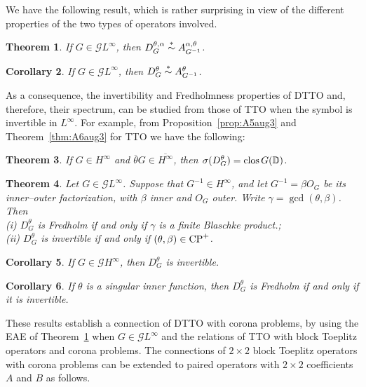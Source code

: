 \documentclass[11pt]{article}
\newtheorem{thm}{Theorem}[section]
\newtheorem{cor}[thm]{Corollary}
\def\DD{\mathbb D}
\def\G{\mathcal G}
\def\ol{\overline}
\newcommand{\simast}{%
    \ensuremath{%
       \stackrel{\mathsf{\ast}}{\sim}}}
\def\CP{{\rm CP}}
\def\clos{\mathop{\rm clos}\nolimits}
\begin{document}
 We have the following result, which is rather surprising in view of the different properties
 of the two types of operators involved.
 
 \begin{thm}\cite{CKLP}\label{thm:4.1Baug3}
 If $G \in \G L^\infty$, then $D^{\theta,\alpha}_G \simast A^{\alpha,\theta}_{G^{-1}}$.
 \end{thm}
 
 \begin{cor} \cite{CKLP}
  If $G \in \G L^\infty$, then $D^{\theta}_G \simast A^{\theta}_{G^{-1}}$.
  \end{cor}
  
  As a consequence, the invertibility and Fredholmness properties of DTTO and, therefore, their spectrum, can   be studied from those of TTO when the symbol is invertible in $L^\infty$.
For example, from Proposition~\ref{prop:A5aug3} and Theorem~\ref{thm:A6aug3} for TTO we have the following:
  
  \begin{thm}\cite{CKLP}
  If $G \in H^\infty$ and $\ol\theta G \in \ol{H^\infty}$, then
  $\sigma(D^\theta_G)=\clos G(\DD)$.
  \end{thm}
  
  \begin{thm}\cite{CKLP}
  Let $G \in \G L^\infty$. Suppose that $G^{-1} \in H^\infty$, and let $G^{-1}=\beta O_G$ be its inner--outer factorization, with $\beta$ inner and $O_G$ outer. Write $\gamma= \gcd(\theta,\beta)$. Then\\
  (i) $D^\theta_G$ is Fredholm if and only if $\gamma$ is a finite Blaschke product.;
  \\
  (ii) $D^\theta_G$ is invertible if and only if $(\theta,\beta) \in \CP^+$.
  \end{thm}
  
  \begin{cor}
  If $G \in \G H^\infty$, then $D^\theta_G$ is invertible.
  \end{cor}
  
  \begin{cor}
  If $\theta$ is a singular inner function, then $D^\theta_G$ is Fredholm if and only if it is invertible.
  \end{cor}
  
  These results establish a connection of DTTO with corona problems, by using the EAE of Theorem~\ref{thm:4.1Baug3} when $G \in \G L^\infty$ and the relations of TTO with block Toeplitz operators and corona problems. The connections of $2\times 2$ block
  Toeplitz operators with corona problems can be extended to paired operators with $2 \times 2$ coefficients $A$ and $B$ as follows.
  
\end{document}
